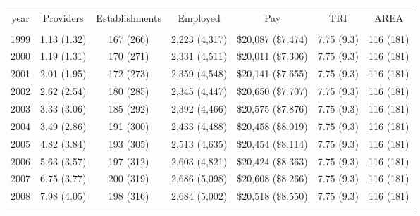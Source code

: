 
\begin{table}[!htbp] \centering 
  \caption{} 
  \label{} 
\begin{tabular}{@{\extracolsep{5pt}} ccccccc} 
\\[-1.8ex]\hline 
\hline \\[-1.8ex] 
year & Providers & Establishments & Employed & Pay & TRI & AREA \\ 
\hline \\[-1.8ex] 
1999 & 1.13 (1.32) & 167 (266) & 2,223 (4,317) & \$20,087 (\$7,474) & 7.75 (9.3) & 116 (181) \\ 
2000 & 1.19 (1.31) & 170 (271) & 2,331 (4,511) & \$20,011 (\$7,306) & 7.75 (9.3) & 116 (181) \\ 
2001 & 2.01 (1.95) & 172 (273) & 2,359 (4,548) & \$20,141 (\$7,655) & 7.75 (9.3) & 116 (181) \\ 
2002 & 2.62 (2.54) & 180 (285) & 2,345 (4,447) & \$20,650 (\$7,707) & 7.75 (9.3) & 116 (181) \\ 
2003 & 3.33 (3.06) & 185 (292) & 2,392 (4,466) & \$20,575 (\$7,876) & 7.75 (9.3) & 116 (181) \\ 
2004 & 3.49 (2.86) & 191 (300) & 2,433 (4,488) & \$20,458 (\$8,019) & 7.75 (9.3) & 116 (181) \\ 
2005 & 4.82 (3.84) & 193 (305) & 2,513 (4,635) & \$20,454 (\$8,114) & 7.75 (9.3) & 116 (181) \\ 
2006 & 5.63 (3.57) & 197 (312) & 2,603 (4,821) & \$20,424 (\$8,363) & 7.75 (9.3) & 116 (181) \\ 
2007 & 6.75 (3.77) & 200 (319) & 2,686 (5,098) & \$20,608 (\$8,266) & 7.75 (9.3) & 116 (181) \\ 
2008 & 7.98 (4.05) & 198 (316) & 2,684 (5,002) & \$20,518 (\$8,550) & 7.75 (9.3) & 116 (181) \\ 
\hline \\[-1.8ex] 
\end{tabular} 
\end{table} 
